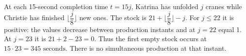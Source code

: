 At each 15-second completion time $t=15j$, Katrina has unfolded $j$ cranes while Christie has finished $\lfloor\dfrac{j}{8}\rfloor$ new ones. The stock is $21+\lfloor\dfrac{j}{8}\rfloor-j$. For $j\le22$ it is positive: the values decrease between production instants and at $j=22$ equal 1. At $j=23$ it is $21+2-23=0$. Thus the first empty stock occurs at $15\cdot23=\boxed{345\text{ seconds}}$. There is no simultaneous production at that instant.

